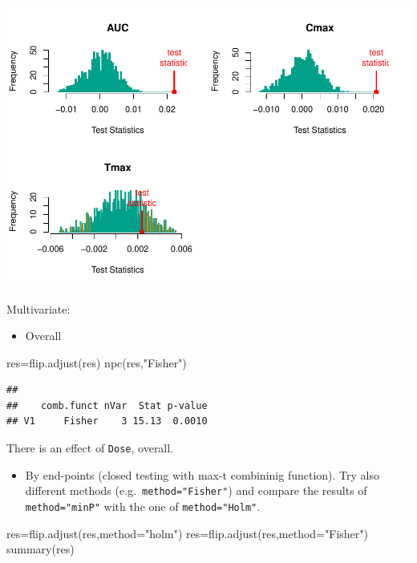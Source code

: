 \documentclass[
]{article}
\newenvironment{Shaded}{\begin{snugshade}}{\end{snugshade}}
\newcommand{\AttributeTok}[1]{\textcolor[rgb]{0.77,0.63,0.00}{#1}}
\newcommand{\FunctionTok}[1]{\textcolor[rgb]{0.00,0.00,0.00}{#1}}
\newcommand{\NormalTok}[1]{#1}
\newcommand{\OtherTok}[1]{\textcolor[rgb]{0.56,0.35,0.01}{#1}}
\newcommand{\StringTok}[1]{\textcolor[rgb]{0.31,0.60,0.02}{#1}}
\providecommand{\tightlist}{%
  \setlength{\itemsep}{0pt}\setlength{\parskip}{0pt}}
\begin{document}
\begin{center}\includegraphics{perm_files/figure-latex/unnamed-chunk-42-1} \end{center}

Multivariate:

\begin{itemize}
\tightlist
\item
  Overall
\end{itemize}

\begin{Shaded}
\begin{Highlighting}[]
\NormalTok{res}\OtherTok{=}\FunctionTok{flip.adjust}\NormalTok{(res)}
\FunctionTok{npc}\NormalTok{(res,}\StringTok{"Fisher"}\NormalTok{)}
\end{Highlighting}
\end{Shaded}

\begin{verbatim}
## 
##    comb.funct nVar  Stat p-value
## V1     Fisher    3 15.13  0.0010
\end{verbatim}

There is an effect of \texttt{Dose}, overall.

\begin{itemize}
\tightlist
\item
  By end-points (closed testing with max-t combininig function). Try
  also different methods (e.g.~\texttt{method="Fisher"}) and compare the
  results of \texttt{method="minP"} with the one of
  \texttt{method="Holm"}.
\end{itemize}

\begin{Shaded}
\begin{Highlighting}[]
\NormalTok{res}\OtherTok{=}\FunctionTok{flip.adjust}\NormalTok{(res,}\AttributeTok{method=}\StringTok{"holm"}\NormalTok{)}
\NormalTok{res}\OtherTok{=}\FunctionTok{flip.adjust}\NormalTok{(res,}\AttributeTok{method=}\StringTok{"Fisher"}\NormalTok{)}
\FunctionTok{summary}\NormalTok{(res)}
\end{Highlighting}
\end{Shaded}
\end{document}
